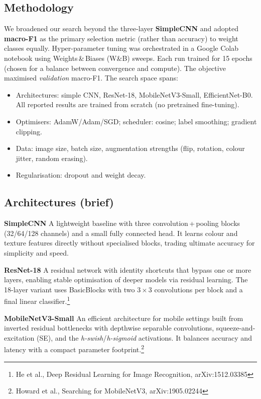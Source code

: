 \documentclass[11pt,a4paper]{article}
\begin{document}
\subsection{Methodology}
We broadened our search beyond the three-layer \textbf{SimpleCNN} and adopted \textbf{macro-F1} as the primary selection metric (rather than accuracy) to weight classes equally. Hyper-parameter tuning was orchestrated in a Google Colab notebook using Weights\,&\,Biases (W\&B) sweeps. Each run trained for 15 epochs (chosen for a balance between convergence and compute). The objective maximised \emph{validation} macro-F1. The search space spans:
\begin{itemize}
  \item Architectures: simple CNN, ResNet-18, MobileNetV3-Small, EfficientNet-B0. All reported results are trained from scratch (no pretrained fine-tuning).
  \item Optimisers: AdamW/Adam/SGD; scheduler: cosine; label smoothing; gradient clipping.
  \item Data: image size, batch size, augmentation strengths (flip, rotation, colour jitter, random erasing).
  \item Regularisation: dropout and weight decay.
\end{itemize}

\subsection{Architectures (brief)}
\textbf{SimpleCNN}\; A lightweight baseline with three convolution\,+\,pooling blocks (32/64/128 channels) and a small fully connected head. It learns colour and texture features directly without specialised blocks, trading ultimate accuracy for simplicity and speed.

\textbf{ResNet-18}\; A residual network with identity shortcuts that bypass one or more layers, enabling stable optimisation of deeper models via residual learning. The 18-layer variant uses BasicBlocks with two 3\,\(\times\)\,3 convolutions per block and a final linear classifier.\footnote{He et al., Deep Residual Learning for Image Recognition, arXiv:1512.03385}

\textbf{MobileNetV3-Small}\; An efficient architecture for mobile settings built from inverted residual bottlenecks with depthwise separable convolutions, squeeze-and-excitation (SE), and the \textit{h-swish}/\textit{h-sigmoid} activations. It balances accuracy and latency with a compact parameter footprint.\footnote{Howard et al., Searching for MobileNetV3, arXiv:1905.02244}
\end{document}
